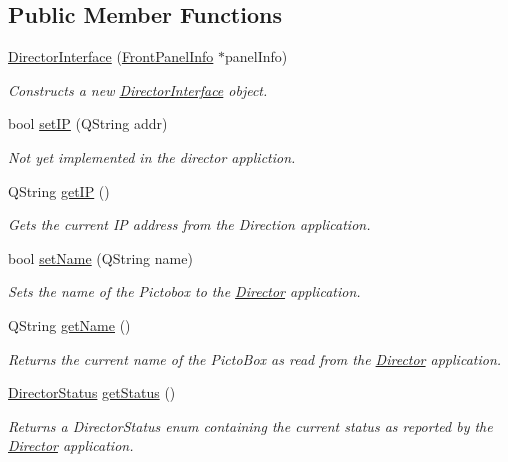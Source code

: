 \subsection*{Public Member Functions}
\begin{DoxyCompactItemize}
\item 
\hyperlink{class_director_interface_af038ceceaba3376519b2fac8f6124a3c}{Director\-Interface} (\hyperlink{class_front_panel_info}{Front\-Panel\-Info} $\ast$panel\-Info)
\begin{DoxyCompactList}\small\item\em Constructs a new \hyperlink{class_director_interface}{Director\-Interface} object. \end{DoxyCompactList}\item 
bool \hyperlink{class_director_interface_ac461d58ad8cc8bd1e58d48420f48503b}{set\-I\-P} (Q\-String addr)
\begin{DoxyCompactList}\small\item\em Not yet implemented in the director appliction. \end{DoxyCompactList}\item 
Q\-String \hyperlink{class_director_interface_a647ba38d879d6c789472390808b8822c}{get\-I\-P} ()
\begin{DoxyCompactList}\small\item\em Gets the current I\-P address from the Direction application. \end{DoxyCompactList}\item 
bool \hyperlink{class_director_interface_ab5a2e5ae02989b19ed12c0d884aa45f6}{set\-Name} (Q\-String name)
\begin{DoxyCompactList}\small\item\em Sets the name of the Pictobox to the \hyperlink{class_director}{Director} application. \end{DoxyCompactList}\item 
Q\-String \hyperlink{class_director_interface_aa9978bbc809f4026682fa869b55a1aa5}{get\-Name} ()
\begin{DoxyCompactList}\small\item\em Returns the current name of the Picto\-Box as read from the \hyperlink{class_director}{Director} application. \end{DoxyCompactList}\item 
\hyperlink{_director_interface_8h_add118e59eefaadc163fc7f91ddadd7a4}{Director\-Status} \hyperlink{class_director_interface_a1a10f1dcc4f45cb7d4c24f1f40dadd81}{get\-Status} ()
\begin{DoxyCompactList}\small\item\em Returns a Director\-Status enum containing the current status as reported by the \hyperlink{class_director}{Director} application. \end{DoxyCompactList}\item 

\end{DoxyCompactItemize}

